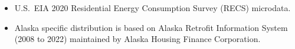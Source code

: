 \begin{itemize}
\item U.S.~EIA 2020 Residential Energy Consumption Survey (RECS) microdata.
\item Alaska specific distribution is based on Alaska Retrofit Information System (2008 to 2022) maintained by Alaska Housing Finance Corporation.
\end{itemize}
